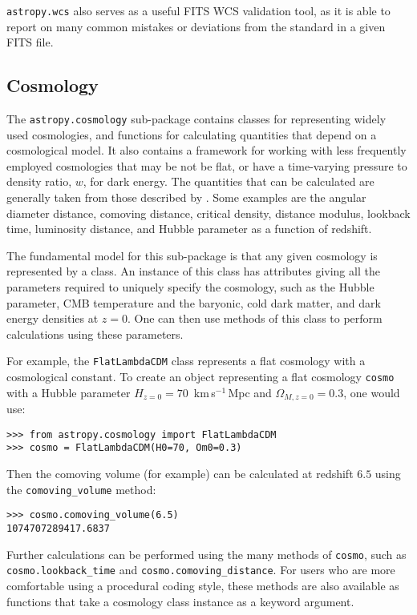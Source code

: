 \documentclass[traditabstract]{aa}
\begin{document}
\texttt{astropy.wcs} also serves as a useful FITS WCS validation tool,
as it is able to report on many common mistakes or deviations from the
standard in a given FITS file.

\subsection{Cosmology}


The \texttt{astropy.cosmology} sub-package contains classes for
representing widely used cosmologies, and functions for calculating
quantities that depend on a cosmological model. It also contains a
framework for working with less frequently employed cosmologies that
may be not be flat, or have a time-varying pressure to density ratio,
$w$, for dark energy. The quantities that can be calculated are
generally taken from those described by \citet{Hogg99}. Some examples
are the angular diameter distance, comoving distance, critical
density, distance modulus, lookback time, luminosity distance, and
Hubble parameter as a function of redshift.

The fundamental model for this sub-package is that any given cosmology
is represented by a class. An instance of this class has attributes
giving all the parameters required to uniquely specify the cosmology,
such as the Hubble parameter, CMB temperature and the baryonic, cold
dark matter, and dark energy densities at $z=0$. One can then use
methods of this class to perform calculations using these parameters.

For example, the \texttt{FlatLambdaCDM} class represents a flat
cosmology with a cosmological constant. To create an object
representing a flat cosmology \texttt{cosmo} with a Hubble parameter
$H_{z=0} = 70$~km\,s$^{-1}$\,Mpc and $\Omega_{M,z=0} = 0.3$, one would
use:

\begin{verbatim}
>>> from astropy.cosmology import FlatLambdaCDM
>>> cosmo = FlatLambdaCDM(H0=70, Om0=0.3)
\end{verbatim}

\noindent Then the comoving volume (for example) can be calculated at
redshift $6.5$ using the \texttt{comoving\_volume} method:

\begin{verbatim}
>>> cosmo.comoving_volume(6.5)
1074707289417.6837
\end{verbatim}

\noindent Further calculations can be performed using the many methods
of \texttt{cosmo}, such as \texttt{cosmo.lookback\_time} and
\texttt{cosmo.comoving\_distance}.  For users who are more comfortable
using a procedural coding style, these methods are also available as
functions that take a cosmology class instance as a keyword argument.
\end{document}
